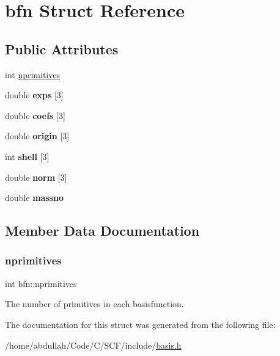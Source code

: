 \hypertarget{structbfn}{}\section{bfn Struct Reference}
\label{structbfn}
\subsection*{Public Attributes}
\begin{DoxyCompactItemize}
\item 
int \hyperlink{structbfn_a42a90196a5b97792bd4db565897c404d}{nprimitives}
\item 
\mbox{\label{structbfn_aa3bcac7c64f2e27ab084807c5be7a129}} 
double {\bfseries exps} \mbox{[}3\mbox{]}
\item 
\mbox{\label{structbfn_acbe596061c63dcdc511e8248c3f17cb3}} 
double {\bfseries coefs} \mbox{[}3\mbox{]}
\item 
\mbox{\label{structbfn_afc68d122879040738d39eb51a17a4580}} 
double {\bfseries origin} \mbox{[}3\mbox{]}
\item 
\mbox{\label{structbfn_a400e60d202aa7c39fded35cdfdb63167}} 
int {\bfseries shell} \mbox{[}3\mbox{]}
\item 
\mbox{\label{structbfn_ab0c241c6146ef903e84c1e5b61dc060b}} 
double {\bfseries norm} \mbox{[}3\mbox{]}
\item 
\mbox{\label{structbfn_a4da7915dbaf7004dc301f88a40ea2073}} 
double {\bfseries massno}
\end{DoxyCompactItemize}


\subsection{Member Data Documentation}
\mbox{\label{structbfn_a42a90196a5b97792bd4db565897c404d}} 
\subsubsection{\texorpdfstring{nprimitives}{nprimitives}}
{\footnotesize\ttfamily int bfn\+::nprimitives}

The number of primitives in each basisfunction. 

The documentation for this struct was generated from the following file\+:\begin{DoxyCompactItemize}
\item 
/home/abdullah/\+Code/\+C/\+S\+C\+F/include/\hyperlink{basis_8h}{basis.\+h}\end{DoxyCompactItemize}
